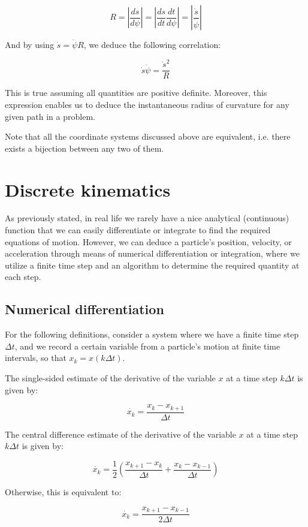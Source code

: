 \documentclass[12pt]{article}
\begin{document}
\[ R = \left|\frac{ds}{d\psi}\right| = \left|\frac{ds}{dt} \frac{dt}{d\psi}\right| = \left|\frac{\dot{s}}{\dot{\psi}}\right|\]

And by using $\dot{s} = \dot{\psi}R$, we deduce the following correlation:

\[ \dot{s}\dot{\psi} = \frac{\dot{s}^2}{R} \]

This is true assuming all quantities are positive definite. Moreover, this expression enables us to deduce the instantaneous radius of curvature for any given path in a problem.

Note that all the coordinate systems discussed above are equivalent, i.e. there exists a bijection between any two of them.

\newpage

\section{Discrete kinematics}

As previously stated, in real life we rarely have a nice analytical (continuous) function that we can easily differentiate or integrate to find the required equations of motion. However, we can deduce a particle's position, velocity, or acceleration through means of numerical differentiation or integration, where we utilize a finite time step and an algorithm to determine the required quantity at each step.

\subsection{Numerical differentiation}

For the following definitions, consider a system where we have a finite time step $\Delta t$, and we record a certain variable from a particle's motion at finite time intervals, so that $x_k = x(k\Delta t)$.

\begin{definition}
    The single-sided estimate of the derivative of the variable $x$ at a time step $k \Delta t$ is given by:

    \[ \dot{x_k} = \frac{x_k - x_{k+1}}{\Delta t} \]
\end{definition}

\begin{definition}
    The central difference estimate of the derivative of the variable $x$ at a time step $k \Delta t$ is given by:

    \[ \dot{x_k} = \frac{1}{2} \left( \frac{x_{k+1} - x_k}{\Delta t} + \frac{x_k - x_{k - 1}}{\Delta t} \right) \]

    Otherwise, this is equivalent to:

    \[ \dot{x_k} = \frac{x_{k+1} - x_{k-1}}{2\Delta t} \]
\end{definition}
\end{document}
